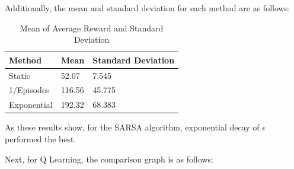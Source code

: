 Additionally, the mean and standard deviation for each method are as follows:

\begin{table}[H]
    \begin{tabular}{lll}
    \hline
    Method      & Mean   & Standard Deviation \\ \hline
    Static      & 52.07  & 7.545              \\
    1/Episodes  & 116.56  & 45.775             \\
    Exponential & 192.32 & 68.383             \\ \hline
    \end{tabular}
    \caption{Mean of Average Reward and Standard Deviation}
\end{table}

As these results show, for the SARSA algorithm, exponential decay of $\epsilon$ performed the best.

Next, for Q Learning, the comparison graph is as follows:




